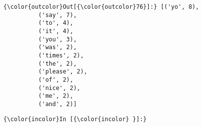 \documentclass[11pt]{article}
\begin{document}
            \begin{Verbatim}[commandchars=\\\{\}]
{\color{outcolor}Out[{\color{outcolor}76}]:} [('yo', 8),
          ('say', 7),
          ('to', 4),
          ('it', 4),
          ('you', 3),
          ('was', 2),
          ('times', 2),
          ('the', 2),
          ('please', 2),
          ('of', 2),
          ('nice', 2),
          ('me', 2),
          ('and', 2)]
\end{Verbatim}
        
    \begin{Verbatim}[commandchars=\\\{\}]
{\color{incolor}In [{\color{incolor} }]:} 
\end{Verbatim}


    
    
    
    
\end{document}
